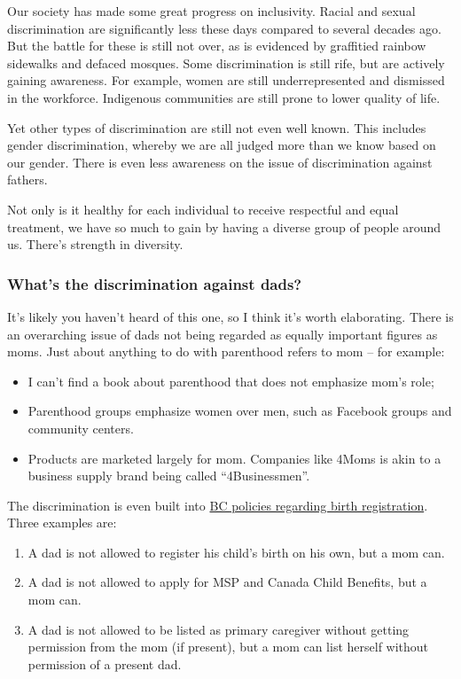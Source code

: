 \documentclass[]{article}
\providecommand{\tightlist}{%
  \setlength{\itemsep}{0pt}\setlength{\parskip}{0pt}}
\begin{document}
Our society has made some great progress on inclusivity. Racial and sexual discrimination are significantly less these days compared to several decades ago. But the battle for these is still not over, as is evidenced by graffitied rainbow sidewalks and defaced mosques. Some discrimination is still rife, but are actively gaining awareness. For example, women are still underrepresented and dismissed in the workforce. Indigenous communities are still prone to lower quality of life.

Yet other types of discrimination are still not even well known. This includes gender discrimination, whereby we are all judged more than we know based on our gender. There is even less awareness on the issue of discrimination against fathers.

Not only is it healthy for each individual to receive respectful and equal treatment, we have so much to gain by having a diverse group of people around us. There's strength in diversity.

\hypertarget{whats-the-discrimination-against-dads}{%
\subsubsection{What's the discrimination against dads?}\label{whats-the-discrimination-against-dads}}

It's likely you haven't heard of this one, so I think it's worth elaborating. There is an overarching issue of dads not being regarded as equally important figures as moms. Just about anything to do with parenthood refers to mom -- for example:

\begin{itemize}
\tightlist
\item
  I can't find a book about parenthood that does not emphasize mom's role;
\item
  Parenthood groups emphasize women over men, such as Facebook groups and community centers.
\item
  Products are marketed largely for mom. Companies like 4Moms is akin to a business supply brand being called ``4Businessmen''.
\end{itemize}

The discrimination is even built into \href{https://www2.gov.bc.ca/gov/content/life-events/birth-adoption/births/birth-registration}{BC policies regarding birth registration}. Three examples are:

\begin{enumerate}
\def\labelenumi{\arabic{enumi}.}
\tightlist
\item
  A dad is not allowed to register his child's birth on his own, but a mom can.
\item
  A dad is not allowed to apply for MSP and Canada Child Benefits, but a mom can.
\item
  A dad is not allowed to be listed as primary caregiver without getting permission from the mom (if present), but a mom can list herself without permission of a present dad.
\end{enumerate}
\end{document}
